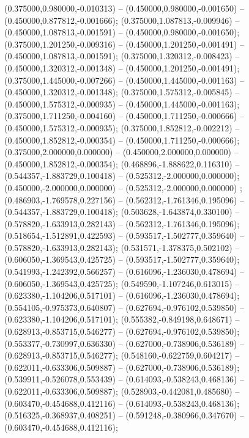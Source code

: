  (0.375000,0.980000,-0.010313) -- (0.450000,0.980000,-0.001650) -- (0.450000,0.877812,-0.001666);
 (0.375000,1.087813,-0.009946) -- (0.450000,1.087813,-0.001591) -- (0.450000,0.980000,-0.001650);
 (0.375000,1.201250,-0.009316) -- (0.450000,1.201250,-0.001491) -- (0.450000,1.087813,-0.001591);
 (0.375000,1.320312,-0.008423) -- (0.450000,1.320312,-0.001348) -- (0.450000,1.201250,-0.001491);
 (0.375000,1.445000,-0.007266) -- (0.450000,1.445000,-0.001163) -- (0.450000,1.320312,-0.001348);
 (0.375000,1.575312,-0.005845) -- (0.450000,1.575312,-0.000935) -- (0.450000,1.445000,-0.001163);
 (0.375000,1.711250,-0.004160) -- (0.450000,1.711250,-0.000666) -- (0.450000,1.575312,-0.000935);
 (0.375000,1.852812,-0.002212) -- (0.450000,1.852812,-0.000354) -- (0.450000,1.711250,-0.000666);
 (0.375000,2.000000,0.000000) -- (0.450000,2.000000,0.000000) -- (0.450000,1.852812,-0.000354);
 (0.468896,-1.888622,0.116310) -- (0.544357,-1.883729,0.100418) -- (0.525312,-2.000000,0.000000);
 (0.450000,-2.000000,0.000000) -- (0.525312,-2.000000,0.000000) ;
 (0.486903,-1.769578,0.227156) -- (0.562312,-1.761346,0.195096) -- (0.544357,-1.883729,0.100418);
 (0.503628,-1.643874,0.330100) -- (0.578820,-1.633913,0.282143) -- (0.562312,-1.761346,0.195096);
 (0.518654,-1.512891,0.422593) -- (0.593517,-1.502777,0.359640) -- (0.578820,-1.633913,0.282143);
 (0.531571,-1.378375,0.502102) -- (0.606050,-1.369543,0.425725) -- (0.593517,-1.502777,0.359640);
 (0.541993,-1.242392,0.566257) -- (0.616096,-1.236030,0.478694) -- (0.606050,-1.369543,0.425725);
 (0.549590,-1.107246,0.613015) -- (0.623380,-1.104206,0.517101) -- (0.616096,-1.236030,0.478694);
 (0.554105,-0.975373,0.640807) -- (0.627694,-0.976102,0.539850) -- (0.623380,-1.104206,0.517101);
 (0.555382,-0.849198,0.648671) -- (0.628913,-0.853715,0.546277) -- (0.627694,-0.976102,0.539850);
 (0.553377,-0.730997,0.636330) -- (0.627000,-0.738906,0.536189) -- (0.628913,-0.853715,0.546277);
 (0.548160,-0.622759,0.604217) -- (0.622011,-0.633306,0.509887) -- (0.627000,-0.738906,0.536189);
 (0.539911,-0.526078,0.553439) -- (0.614093,-0.538243,0.468136) -- (0.622011,-0.633306,0.509887);
 (0.528903,-0.442081,0.485680) -- (0.603470,-0.454688,0.412116) -- (0.614093,-0.538243,0.468136);
 (0.516325,-0.368937,0.408251) -- (0.591248,-0.380966,0.347670) -- (0.603470,-0.454688,0.412116);

